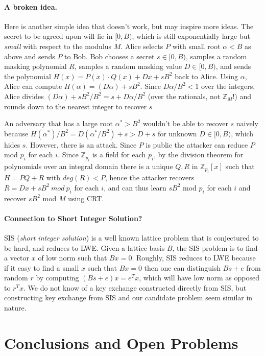 \documentclass[letterpaper,twocolumn,10pt]{article}
\begin{document}
\paragraph{A broken idea.} Here is another simple idea that doesn't work, but may inspire more ideas. The secret to be agreed upon will lie in $[0, B)$, which is still exponentially large but \emph{small} with respect to the modulus $M$. Alice selects $P$ with small root $\alpha < B$ as above and sends $P$ to Bob. Bob chooses a secret $s \in [0, B)$, samples a random masking polynomial $R$, samples a random masking value $D \in [0, B)$, and sends the polynomial $H(x) = P(x) \cdot Q(x) + D x + sB^2$ back to Alice. Using $\alpha$, Alice can compute $H(\alpha) = (D \alpha) + sB^2$. Since $D\alpha/B^2 < 1$ over the integers, Alice divides $(D \alpha) + sB^2 / B^2 = s + D\alpha/B^2$ (over the rationals, not $\mathbb{Z}_M$!) and rounds down to the nearest integer to recover $s$

An adversary that has a large root $\alpha^* > B^2$ wouldn't be able to recover $s$ naively because $H(\alpha^*)/B^2 = D (\alpha^*/ B^2) + s > D + s$ for unknown $D \in [0, B)$, which hides $s$. However, there is an attack. Since $P$ is public the attacker can reduce $P$ mod $p_i$ for each $i$. Since $\mathbb{Z}_{p_i}$ is a field for each $p_i$, by the division theorem for polynomials over an integral domain there is a unique $Q, R$ in $\mathbb{Z}_{p_i}[x]$ such that $H = P Q + R$ with $deg(R) < P$, hence the attacker recovers $R = D x + sB^2 \ mod \ p_i$ for each $i$, and can thus learn $s B^2$ mod $p_i$ for each $i$ and recover $sB^2$ mod $M$ using CRT. 
 
\paragraph{Connection to Short Integer Solution?} SIS (\emph{short integer solution}) is a well known lattice problem that is conjectured to be hard, and reduces to LWE. Given a lattice basis $B$, the SIS problem is to find a vector $x$ of low norm such that $B x = 0$. Roughly, SIS reduces to LWE because if it easy to find a small $x$ such that $Bx = 0$ then one can distinguish $Bs + e$ from random $r$ by computing $(Bs + e) x = e^T x$, which will have low norm as opposed to $r^T x$. We do not know of a key exchange constructed directly from SIS, but constructing key exchange from SIS and our candidate problem seem similar in nature. 

\section{Conclusions and Open Problems}
\end{document}
